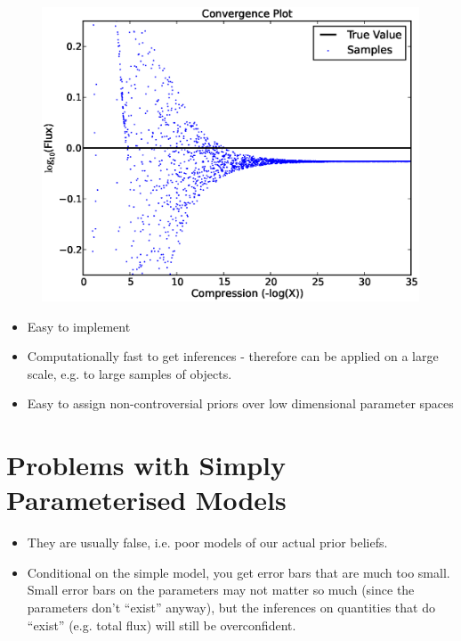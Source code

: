 \documentclass[letterpaper, 11pt]{article}
\begin{document}
\begin{figure}
\begin{center}
\includegraphics[scale=0.5]{convergence.eps}
\caption{\label{convergence}}
\end{center}
\end{figure}

\begin{itemize}
\item Easy to implement \\
\item Computationally fast to get inferences - therefore can be applied on a large scale, e.g. to large samples of objects. \\
\item Easy to assign non-controversial priors over low dimensional parameter spaces \\
\end{itemize}

\section{Problems with Simply Parameterised Models}
\begin{itemize}
\item They are usually false, i.e. poor models of our actual prior beliefs. \\
\item Conditional on the simple model, you get error bars that are much too small. Small error bars on the parameters may not matter so much (since the parameters don't ``exist'' anyway), but the inferences on quantities that do ``exist'' (e.g. total flux) will still be overconfident. \\
\end{itemize}
\end{document}
